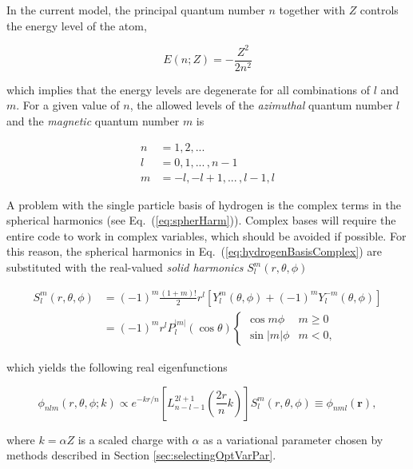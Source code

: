 In the current model, the principal quantum number $n$ together with $Z$ controls the energy level of the atom, 

\begin{equation}
 E(n; Z) = -\frac{Z^2}{2n^2}\label{eq:AtomNonIntEnergy}
\end{equation}

which implies that the energy levels are degenerate for all combinations of $l$ and $m$. For a given value of $n$, the allowed levels of the \textit{azimuthal} quantum number $l$ and the \textit{magnetic} quantum number $m$ is 

\begin{align*}
 n &= 1, 2, ... \\
 l &= 0, 1, ...\,, n-1 \\
 m &= -l, -l + 1, ...\,, l - 1, l
\end{align*}


A problem with the single particle basis of hydrogen is the complex terms in the spherical harmonics (see Eq.~(\ref{eq:spherHarm})). Complex bases will require the entire code to work in complex variables, which should be avoided if possible. For this reason, the spherical harmonics in Eq.~(\ref{eq:hydrogenBasisComplex}) are substituted with the real-valued \textit{solid harmonics} $S_l^m(r, \theta, \phi)$ \cite{SolidHarmonics}

\begin{align}
S_l^m(r, \theta, \phi) &= (-1)^m\frac{(1+m)!}{2}r^l\left[Y_l^m(\theta, \phi) + (-1)^m Y_l^{-m}(\theta, \phi)\right] \\
 &= (-1)^m r^{l} P_l^{|m|}(\cos\theta) \begin{cases} \cos m\phi & m \ge 0 \\ \sin|m|\phi &  m < 0, \end{cases}                                                                                                             
\end{align}

which yields the following real eigenfunctions

\begin{equation}
  \phi_{nlm}(r, \theta, \phi; k) \propto e^{-kr/n}\left[L_{n-l-1}^{2l+1}\left(\frac{2r}{n}k\right)\right] S_l^m(r, \theta, \phi) \equiv \phi_{nml}(\mathbf{r}), \label{eq:hydrogenBasisReal}
\end{equation}

where $k = \alpha Z$ is a scaled charge with $\alpha$ as a variational parameter chosen by methods described in Section \ref{sec:selectingOptVarPar}.

